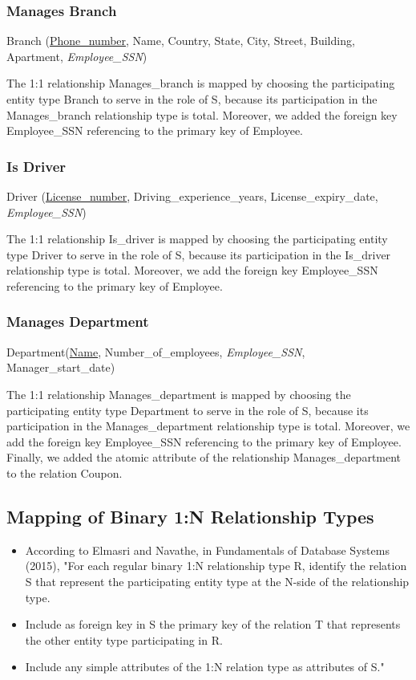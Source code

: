 \subsubsection{Manages Branch}

Branch (\underline{Phone\_number}, Name, Country, State, City, Street, Building, Apartment, \textit{Employee\_SSN})

The 1:1 relationship Manages\_branch is mapped by choosing the participating entity type Branch to serve in the role of S, because its participation in the Manages\_branch relationship type is total. Moreover, we added the foreign key Employee\_SSN referencing to the primary key of Employee.

\subsubsection{Is Driver}

Driver (\underline{License\_number}, Driving\_experience\_years, License\_expiry\_date, \textit{Employee\_SSN})

The 1:1 relationship Is\_driver is mapped by choosing the participating entity type Driver to serve in the role of S, because its participation in the Is\_driver relationship type is total. Moreover, we add the foreign key Employee\_SSN referencing to the primary key of Employee.

\subsubsection{Manages Department}

Department(\underline{Name}, Number\_of\_employees, \textit{Employee\_SSN}, Manager\_start\_date)

The 1:1 relationship Manages\_department is mapped by choosing the participating entity type Department to serve in the role of S, because its participation in the Manages\_department relationship type is total. Moreover, we add the foreign key Employee\_SSN referencing to the primary key of Employee. Finally, we added the atomic attribute of the relationship Manages\_department to the relation Coupon.

\subsection{Mapping of Binary 1:N Relationship Types}

\begin{itemize}
  \item According to Elmasri and Navathe, in Fundamentals of Database Systems (2015), "For each regular binary 1:N relationship type R, identify the relation S that represent the participating entity type at the N-side of the relationship type.
  \item Include as foreign key in S the primary key of the relation T that represents the other entity type participating in R.
  \item Include any simple attributes of the 1:N relation type as attributes of S." \cite{elmasri}
\end{itemize}

